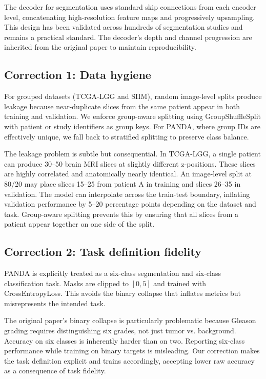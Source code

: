 \documentclass[conference,a4paper]{IEEEtran}
\begin{document}
The decoder for segmentation uses standard skip connections from each encoder level, concatenating high-resolution feature maps and progressively upsampling. This design has been validated across hundreds of segmentation studies and remains a practical standard. The decoder's depth and channel progression are inherited from the original paper to maintain reproducibility.

\subsection{Correction 1: Data hygiene}
For grouped datasets (TCGA-LGG and SIIM), random image-level splits produce leakage because near-duplicate slices from the same patient appear in both training and validation. We enforce group-aware splitting using GroupShuffleSplit with patient or study identifiers as group keys. For PANDA, where group IDs are effectively unique, we fall back to stratified splitting to preserve class balance.

The leakage problem is subtle but consequential. In TCGA-LGG, a single patient can produce 30--50 brain MRI slices at slightly different z-positions. These slices are highly correlated and anatomically nearly identical. An image-level split at 80/20 may place slices 15--25 from patient A in training and slices 26--35 in validation. The model can interpolate across the train-test boundary, inflating validation performance by 5--20 percentage points depending on the dataset and task. Group-aware splitting prevents this by ensuring that all slices from a patient appear together on one side of the split.

\subsection{Correction 2: Task definition fidelity}
PANDA is explicitly treated as a six-class segmentation and six-class classification task. Masks are clipped to $[0,5]$ and trained with CrossEntropyLoss. This avoids the binary collapse that inflates metrics but misrepresents the intended task.

The original paper's binary collapse is particularly problematic because Gleason grading requires distinguishing six grades, not just tumor vs. background. Accuracy on six classes is inherently harder than on two. Reporting six-class performance while training on binary targets is misleading. Our correction makes the task definition explicit and trains accordingly, accepting lower raw accuracy as a consequence of task fidelity.
\end{document}
